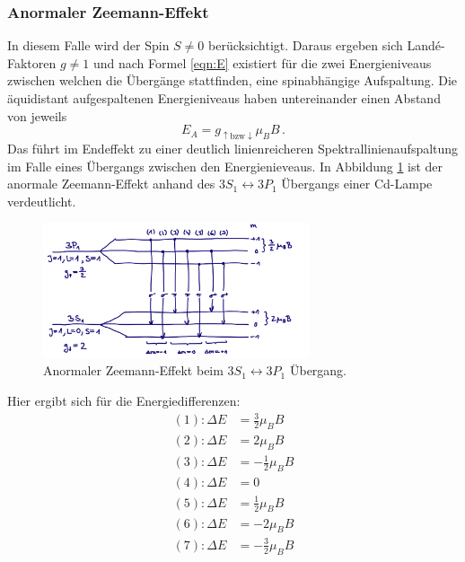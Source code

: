             \subsubsection{Anormaler Zeemann-Effekt}
                In diesem Falle wird der Spin $S\neq 0$ berücksichtigt.
                Daraus ergeben sich Landé-Faktoren $g\neq 1$ und nach Formel \ref{eqn:E}
                existiert für die zwei Energieniveaus zwischen welchen die Übergänge stattfinden, eine spinabhängige Aufspaltung.
                Die äquidistant aufgespaltenen Energieniveaus haben untereinander einen Abstand von jeweils
                \begin{equation}
                    E_A= g_{\uparrow\text{bzw}\downarrow}\mu_BB \, .
                \end{equation}
                Das führt im Endeffekt zu einer deutlich linienreicheren Spektrallinienaufspaltung im Falle eines Übergangs zwischen den Energienieveaus. 
                In Abbildung \ref{fig:ANZ} ist der anormale Zeemann-Effekt anhand des $3S_1\leftrightarrow 3P_1$ Übergangs einer Cd-Lampe verdeutlicht.
                \begin{figure}[h]
                    \centering
                    \includegraphics[width = 0.7\textwidth]{pictures/anormal.png}
                    \caption{Anormaler Zeemann-Effekt beim $3S_1\leftrightarrow 3P_1$ Übergang.}
                    \label{fig:ANZ}
                \end{figure}
                Hier ergibt sich für die Energiedifferenzen:
                \begin{align}
                    (1): \Delta E&=\frac{3}{2}\mu_BB \\
                    (2): \Delta E&=2\mu_BB \\
                    (3): \Delta E&=-\frac{1}{2}\mu_BB \\
                    (4): \Delta E&=0 \\
                    (5): \Delta E&=\frac{1}{2}\mu_BB \\
                    (6): \Delta E&=-2\mu_BB \\
                    (7): \Delta E&=-\frac{3}{2}\mu_BB \\                
                \end{align}


